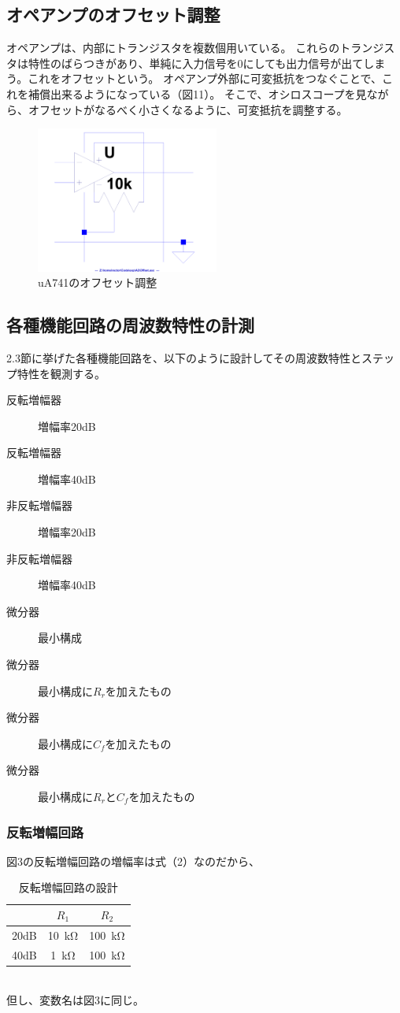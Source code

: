 \documentclass[10pt,a4j,dvipdfmx]{jsarticle}
\makeatletter
\let\@oldsubsec\subsection
\renewcommand{\subsection}[1]{\vspace{-7pt}\@oldsubsec{#1}}
\makeatother
\begin{document}
\subsection{オペアンプのオフセット調整}
オペアンプは、内部にトランジスタを複数個用いている。
これらのトランジスタは特性のばらつきがあり、単純に入力信号を0にしても出力信号が出てしまう。これをオフセットという。
オペアンプ外部に可変抵抗をつなぐことで、これを補償出来るようになっている（図11）。
そこで、オシロスコープを見ながら、オフセットがなるべく小さくなるように、可変抵抗を調整する。
\begin{figure}[H]
  \centering
  \includegraphics[width=6cm, angle=270]{Offset.pdf}
  \caption{uA741のオフセット調整}
\end{figure}

\subsection{各種機能回路の周波数特性の計測}
2.3節に挙げた各種機能回路を、以下のように設計してその周波数特性とステップ特性を観測する。
\begin{description}
\item[反転増幅器] 増幅率20dB
\item[反転増幅器] 増幅率40dB
\item[非反転増幅器] 増幅率20dB
\item[非反転増幅器] 増幅率40dB
\item[微分器] 最小構成 
\item[微分器] 最小構成に$R_r$を加えたもの
\item[微分器] 最小構成に$C_f$を加えたもの
\item[微分器] 最小構成に$R_r$と$C_f$を加えたもの
\end{description}

\subsubsection{反転増幅回路}
図3の反転増幅回路の増幅率は式（2）なのだから、
\begin{table}[htb]
  \begin{center}
    \caption{反転増幅回路の設計}
    \begin{tabular}{|l||c|c|} \hline
       & $R_1$ & $R_2$\\ \hline \hline
      20dB & \SI{10}{\kilo\ohm} & \SI{100}{\kilo\ohm} \\
      40dB & \SI{1}{\kilo\ohm} & \SI{100}{\kilo\ohm} \\ \hline
    \end{tabular}
    \\但し、変数名は図3に同じ。
  \end{center}
\end{table}
\end{document}
